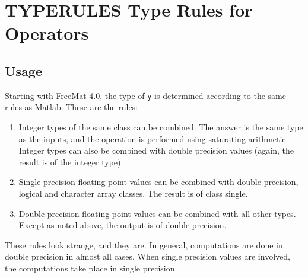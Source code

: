 \section{TYPERULES Type Rules for Operators}

\subsection{Usage}

Starting with FreeMat 4.0, the type of \verb|y| is determined according to the
same rules as Matlab.  These are the rules:
\begin{enumerate}
\item Integer types of the same class can be combined.  The answer is
the same type as the inputs, and the operation is performed using 
saturating arithmetic.  Integer types can also be combined with double
precision values (again, the result is of the integer type).
\item Single precision floating point values can be combined with double
precision, logical and character array classes.  The result is of 
class single.
\item Double precision floating point values can be combined with all
other types.  Except as noted above, the output is of double precision.
\end{enumerate}
These rules look strange, and they are.   In general, computations are
done in double precision in almost all cases.  When single precision
values are involved, the computations take place in single precision.
